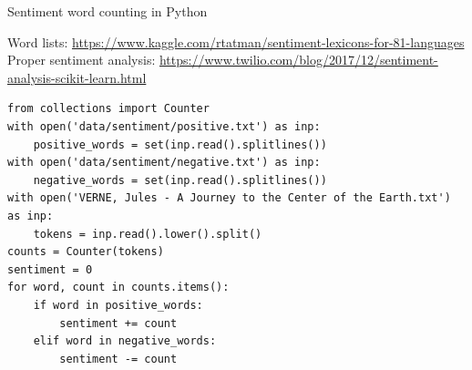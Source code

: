 \documentclass[aspectratio=169,usenames,dvipsnames]{beamer}
\begin{document}
\begin{frame}[fragile]{Sentiment word counting in Python}
    \begin{reference}\scriptsize
        Word lists: \url{https://www.kaggle.com/rtatman/sentiment-lexicons-for-81-languages} \\
        Proper sentiment analysis: \url{https://www.twilio.com/blog/2017/12/sentiment-analysis-scikit-learn.html}
    \end{reference}
\begin{lstlisting}
from collections import Counter
with open('data/sentiment/positive.txt') as inp:
    positive_words = set(inp.read().splitlines())
with open('data/sentiment/negative.txt') as inp:
    negative_words = set(inp.read().splitlines())
with open('VERNE, Jules - A Journey to the Center of the Earth.txt') as inp:
    tokens = inp.read().lower().split()
counts = Counter(tokens)
sentiment = 0
for word, count in counts.items():
    if word in positive_words:
        sentiment += count
    elif word in negative_words:
        sentiment -= count
\end{lstlisting}
\end{frame}
\end{document}
